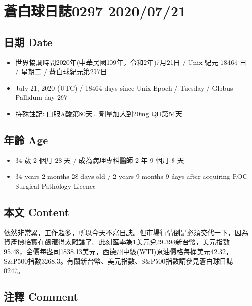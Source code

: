 \documentclass[a5paper, 11pt
]{book}
\providecommand{\tightlist}{%
  \setlength{\itemsep}{0pt}\setlength{\parskip}{0pt}}
\begin{document}
\hypertarget{ux84bcux767dux7403ux65e5ux8a8c0297-20200721}{%
\section{蒼白球日誌0297
2020/07/21}\label{ux84bcux767dux7403ux65e5ux8a8c0297-20200721}}

\hypertarget{ux65e5ux671f-date-45}{%
\subsection{日期 Date}\label{ux65e5ux671f-date-45}}

\begin{itemize}
\tightlist
\item
  世界協調時間2020年(中華民國109年，令和2年)7月21日 / Unix 紀元 18464 日
  / 星期二 / 蒼白球紀元第297日
\item
  July 21, 2020 (UTC) / 18464 days since Unix Epoch / Tuesday / Globus
  Pallidum day 297
\item
  特殊註記: 口服A酸第80天，劑量加大到20mg QD第54天
\end{itemize}

\hypertarget{ux5e74ux9f61-age-45}{%
\subsection{年齡 Age}\label{ux5e74ux9f61-age-45}}

\begin{itemize}
\tightlist
\item
  34 歲 2 個月 28 天 / 成為病理專科醫師 2 年 9 個月 9 天
\item
  34 years 2 months 28 days old / 2 years 9 months 9 days after
  acquiring ROC Surgical Pathology Licence
\end{itemize}

\hypertarget{ux672cux6587-content-45}{%
\subsection{本文 Content}\label{ux672cux6587-content-45}}

依然非常累，工作超多，所以今天不寫日誌。但市場行情倒是必須交代一下，因為資產價格實在飆漲得太離譜了。此刻匯率為1美元兌29.398新台幣，美元指數95.48，金價每盎司1838.13美元，西德州中級(WTI)原油價格每桶美元42.32，S\&P500指數3268.3。有關新台幣、美元指數、S\&P500指數請參見蒼白球日誌0247。

\hypertarget{ux6ce8ux91cb-comment-45}{%
\subsection{注釋 Comment}\label{ux6ce8ux91cb-comment-45}}
\end{document}
